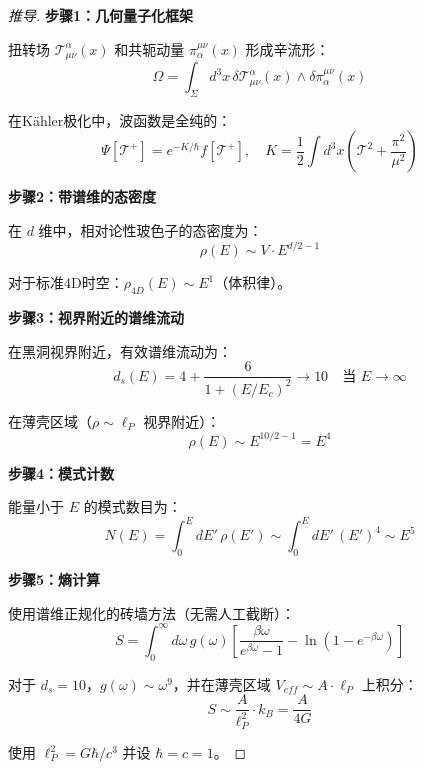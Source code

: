 \begin{proof}[推导]

\textbf{步骤1：几何量子化框架}

扭转场 $\mathcal{T}^\alpha_{\mu\nu}(x)$ 和共轭动量 $\pi_\alpha^{\mu\nu}(x)$ 形成辛流形：
\begin{equation}
    \Omega = \int_\Sigma d^3x \, \delta \mathcal{T}^\alpha_{\mu\nu}(x) \wedge \delta \pi_\alpha^{\mu\nu}(x)
\end{equation}

在Kähler极化中，波函数是全纯的：
\begin{equation}
    \Psi[\mathcal{T}^+] = e^{-K/\hbar} f[\mathcal{T}^+], \quad K = \frac{1}{2}\int d^3x \left(\mathcal{T}^2 + \frac{\pi^2}{\mu^2}\right)
\end{equation}

\textbf{步骤2：带谱维的态密度}

在 $d$ 维中，相对论性玻色子的态密度为：
\begin{equation}
    \rho(E) \sim V \cdot E^{d/2 - 1}
\end{equation}

对于标准4D时空：$\rho_{4D}(E) \sim E^1$（体积律）。

\textbf{步骤3：视界附近的谱维流动}

在黑洞视界附近，有效谱维流动为：
\begin{equation}
    d_s(E) = 4 + \frac{6}{1 + (E/E_c)^2} \to 10 \quad \text{当 } E \to \infty
\end{equation}

在薄壳区域（$\rho \sim \ell_P$ 视界附近）：
\begin{equation}
    \rho(E) \sim E^{10/2 - 1} = E^4
\end{equation}

\textbf{步骤4：模式计数}

能量小于 $E$ 的模式数目为：
\begin{equation}
    N(E) = \int_0^E dE' \, \rho(E') \sim \int_0^E dE' \, (E')^4 \sim E^5
\end{equation}

\textbf{步骤5：熵计算}

使用谱维正规化的砖墙方法（无需人工截断）：
\begin{equation}
    S = \int_0^\infty d\omega \, g(\omega) \left[\frac{\beta\omega}{e^{\beta\omega} - 1} - \ln(1 - e^{-\beta\omega})\right]
\end{equation}

对于 $d_s = 10$，$g(\omega) \sim \omega^9$，并在薄壳区域 $V_{eff} \sim A \cdot \ell_P$ 上积分：
\begin{equation}
    S \sim \frac{A}{\ell_P^2} \cdot k_B = \frac{A}{4G}
\end{equation}

使用 $\ell_P^2 = G\hbar/c^3$ 并设 $\hbar = c = 1$。
\end{proof}

